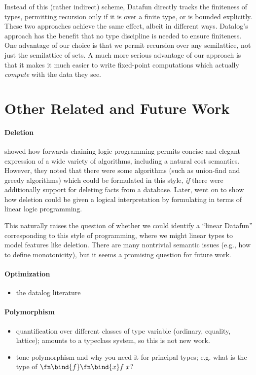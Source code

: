Instead of this (rather indirect) scheme, Datafun directly tracks the
finiteness of types, permitting recursion only if it is over a finite
type, or is bounded explicitly. These two approaches achieve the same
effect, albeit in different ways. Datalog's approach has the benefit
that no type discipline is needed to ensure finiteness. One advantage
of our choice is that we permit recursion over any semilattice, not
just the semilattice of sets. A much more serious advantage of our
approach is that it makes it much easier to write fixed-point
computations which actually \emph{compute} with the data they see.



\section{Other Related and Future Work}
\label{sec:futurework}

\paragraph{Deletion} \citet{logical-algorithms} showed how
forwards-chaining logic programming permits concise and elegant
expression of a wide variety of algorithms, including a natural cost
semantics. However, they noted that there were some algorithms (such
as union-find and greedy algorithms) which could be formulated in this
style, \emph{if} there were additionally support for deleting facts
from a database. Later, \citet{linear-logical-algorithms} went on to
show how deletion could be given a logical interpretation by
formulating in terms of linear logic programming.

This naturally raises the question of whether we could identify a
``linear Datafun'' corresponding to this style of programming, where
we might linear types to model features like deletion. There are many
nontrivial semantic issues (e.g., how to define monotonicity), but
it seems a promising question for future work.



\paragraph{Optimization}
\begin{itemize}
\item \TODO the datalog literature
\end{itemize}

\paragraph{Polymorphism}
\begin{itemize}
\item \TODO quantification over different classes of type variable (ordinary,
  equality, lattice); amounts to a typeclass system, so this is not new work.
\item \TODO tone polymorphism and why you need it for principal types; e.g.
  what is the type of $\fn\bind{f}\fn\bind{x} f\;x$?
\end{itemize}

